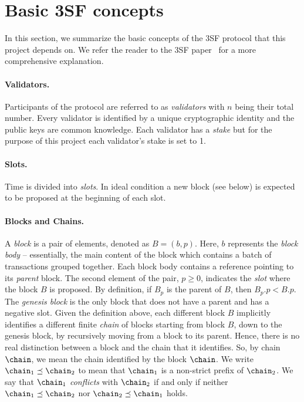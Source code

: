 
\section{Basic 3SF concepts}\label{sec:3sf}

In this section, we summarize the basic concepts of the 3SF protocol that this project depends on.
We refer the reader to the 3SF paper~\cite{d20243} for a more comprehensive explanation.

\paragraph*{Validators.} Participants of the protocol are referred to as \emph{validators} with $n$ being their total number.
Every validator is identified by a unique cryptographic identity and the public keys are common knowledge. 
Each validator has a \emph{stake} but for the purpose of this project each validator's stake is set to 1.

\paragraph*{Slots.} Time is divided into \emph{slots}. 
In ideal condition a new block (see below) is expected to be proposed at the beginning of each slot.

\paragraph{Blocks and Chains.} 
A \emph{block} is a pair of elements, denoted as \( B = (b,p) \). Here, \( b \) represents the \emph{block body} -- essentially, the main content of the block which contains a batch of transactions grouped together.
Each block body contains a reference pointing to its \emph{parent} block. 
The second element of the pair, \( p \geq 0 \), indicates the \emph{slot} where the block \( B \) is proposed.
By definition, if $B_p$ is the parent of $B$, then $B_p.p < B.p$.
The \emph{genesis block} is the only block that does not have a parent {and has a negative slot}.
Given the definition above, each different block $B$ implicitly identifies a different finite \emph{chain} of blocks starting from block $B$, down to the genesis block, by recursively moving from a block to its parent.
Hence, there is no real distinction between a block and the chain that it identifies.
So, by chain $\chain$, we mean the chain identified by the block $\chain$.
We write $\chain_1 \preceq \chain_2$ to mean that $\chain_1$ is a non-strict prefix of $\chain_2$.
We say that $\chain_1$ \emph{conflicts} with $\chain_2$ if and only if neither $\chain_1 \preceq \chain_2$ nor $\chain_2 \preceq \chain_1$ holds. 


